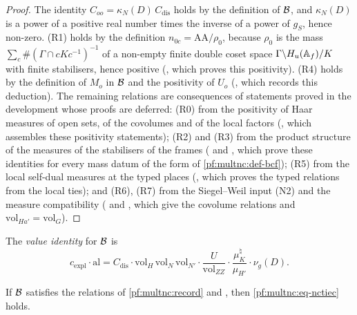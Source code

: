 \begin{proof}
The identity $C_{oo}=\kappa_N(D)\,C_{\mathrm{dis}}$ holds by the definition of $\mathcal{B}$, and $\kappa_N(D)$ is a power of a
positive real number times the inverse of a power of $g_S$, hence non-zero. (R1) holds by the definition
$n_{0c}=\mathrm{AA}/\rho_0$, because $\rho_0$ is the mass $\sum_c\#(\Gamma\cap cKc^{-1})^{-1}$ of a non-empty finite
double coset space $\Gamma\backslash H_u(\mathbb{A}_{f})/K$ with finite stabilisers, hence positive
(, which proves this positivity). (R4) holds by the definition of $M_o$ in $\mathcal{B}$ and the positivity of $U_o$
(, which records this deduction). The remaining relations are
consequences of statements proved in the development whose proofs are deferred: (R0) from the positivity of Haar measures
of open sets, of the covolumes and of the local factors (,
which assembles these positivity statements); (R2) and (R3) from the product structure of the measures of the stabilisers
of the frames ( and
, which prove these identities for every mass datum of the
form of \cref{pf:multnc:def-bcf}); (R5) from the local self-dual measures at the typed places
(, which proves the typed relations from the local ties); and (R6),
(R7) from the Siegel--Weil input (N2) and the measure compatibility (
and , which give the covolume relations and
$\mathrm{vol}_{Ha'}=\mathrm{vol}_G$).
\end{proof}

\begin{definition}\label{pf:multnc:def-ncvalue}
The \emph{value identity}  for $\mathcal{B}$ is
\begin{equation}\label{pf:multnc:eq-ncvalue}
c_{\mathrm{expl}}\cdot\mathrm{al}=C_{\mathrm{dis}}\cdot\mathrm{vol}_H\,\mathrm{vol}_N\,\mathrm{vol}_{N'}\cdot
\frac{U}{\mathrm{vol}_{ZZ}}\cdot\frac{\mu_K^\natural}{\mu_{H'}}\cdot\nu_g(D).
\end{equation}
\end{definition}

\begin{proposition}\label{pf:multnc:ncvalue-suffices}
If $\mathcal{B}$ satisfies the relations of \cref{pf:multnc:record} and , then \eqref{pf:multnc:eq-nctiec} holds.
\end{proposition}

